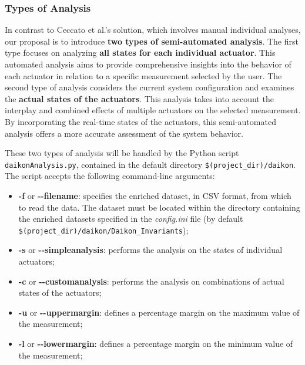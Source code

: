 \subsubsection{Types of Analysis}
\label{subsub:4_types_analysis}

In contrast to Ceccato et al.'s solution, which involves manual individual analyses, our proposal is to introduce \textbf{two types of semi-automated analysis}.\newline 
The first type focuses on analyzing \textbf{all states for each individual actuator}. This automated analysis aims to provide comprehensive insights into the behavior of each actuator in relation to a specific measurement selected by the user.\newline
The second type of analysis considers the current system configuration and examines the \textbf{actual states of the actuators}. This analysis takes into account the interplay and combined effects of multiple actuators on the selected measurement. By incorporating the real-time states of the actuators, this semi-automated analysis offers a more accurate assessment of the system behavior.

\bigskip
These two types of analysis will be handled by the Python script\\ \texttt{daikonAnalysis.py}, contained in the default directory \texttt{\$(project\_dir)/daikon}.\newline
The script accepts the following command-line arguments:

\begin{itemize}
	\item \textbf{-f} or \textbf{{-}{-}filename}: specifies the enriched dataset, in CSV format, from which to read the data. The dataset must be located within the directory containing the enriched datasets specified in the \textit{config.ini} file (by default \texttt{\$(project\_dir)/daikon/Daikon\_Invariants});
	
	\item \textbf{-s} or \textbf{{-}{-}simpleanalysis}: performs the analysis on the states of individual actuators;
	
	\item \textbf{-c} or \textbf{{-}{-}customanalysis}: performs the analysis on combinations of actual states of the actuators;
	
	\item \textbf{-u} or \textbf{{-}{-}uppermargin}: defines a percentage margin on the maximum value of the measurement;
	
	\item \textbf{-l} or \textbf{{-}{-}lowermargin}: defines a percentage margin on the minimum value of the measurement;
\end{itemize}

